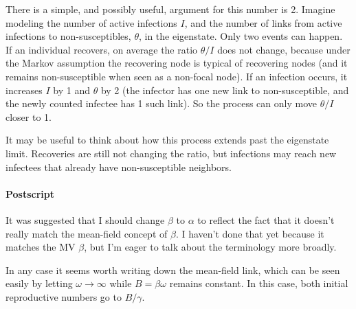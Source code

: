 \documentclass[12pt]{article}
\begin{document}
There is a simple, and possibly useful, argument for this number is 2. Imagine modeling the number of active infections $I$, and the number of links from active infections to non-susceptibles, $\theta$, in the eigenstate. Only two events can happen. If an individual recovers, on average the ratio $\theta/I$ does not change, because under the Markov assumption the recovering node is typical of recovering nodes (and it remains non-susceptible when seen as a non-focal node). If an infection occurs, it increases $I$ by 1 and $\theta$ by 2 (the infector has one new link to non-susceptible, and the newly counted infectee has 1 such link). So the process can only move $\theta/I$ closer to 1.

It may be useful to think about how this process extends past the eigenstate limit. Recoveries are still not changing the ratio, but infections may reach new infectees that already have non-susceptible neighbors.

\paragraph*{Postscript} It was suggested that I should change $\beta$ to $\alpha$ to reflect the fact that it doesn't really match the mean-field concept of $\beta$. I haven't done that yet because it matches the MV $\beta$, but I'm eager to talk about the terminology more broadly.

In any case it seems worth writing down the mean-field link, which can be seen easily by letting $\omega\to\infty$ while $B=\beta\omega$ remains constant. In this case, both initial reproductive numbers go to $B/\gamma$.
\end{document}
